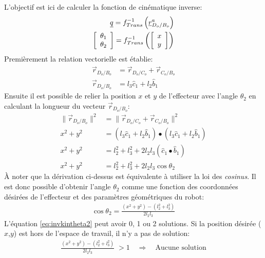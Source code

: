 L'objectif est ici de calculer la fonction de cinématique inverse:
\begin{align}
	\underline{q} = f^{-1}_{Trans}\left( \underline{r}^a_{D_o/B_o} \right) \\
	\left[ \begin{array}{c}
			   \theta_1 \\ \theta_2
	\end{array} \right]
	= f^{-1}_{Trans}\left( \left[ \begin{array}{c }
									  x \\ y
	\end{array} \right]  \right)
\end{align}
Premièrement la relation vectorielle est établie:
\begin{align}
	\vec{r}_{D_o/B_o} &=  \vec{r}_{D_o/C_o} + \vec{r}_{C_o/B_o} \\
	\vec{r}_{D_o/B_o} &=  l_3 \hat{c}_1     + l_2 \hat{b}_1
\end{align}
Ensuite il est possible de relier la position $x$ et $y$ de l'effecteur avec l'angle $\theta_2$ en calculant la longueur du vecteur $\vec{r}_{D_o/B_o}$:
\begin{align}
	\| \vec{r}_{D_o/B_o} \|^2  &=  \| \vec{r}_{D_o/C_o} + \vec{r}_{C_o/B_o} \|^2 \\
	x^2 + y^2 &=  (l_3 \hat{c}_1 + l_2 \hat{b}_1) \bullet (l_3 \hat{c}_1+ l_2 \hat{b}_1) \\
	x^2 + y^2 &=  l_2^2 + l_3^2 + 2 l_2 l_3 ( \hat{c}_1 \bullet \hat{b}_1 ) \\
	x^2 + y^2 &=  l_2^2 + l_3^2 + 2 l_2 l_3 \cos \theta_2
\end{align}
À noter que la dérivation ci-dessus est équivalente à utiliser la loi des \textit{cosinus}. Il est donc possible d'obtenir l'angle $\theta_2$ comme une fonction des coordonnées désirées de l'effecteur et des paramètres géométriques du robot:
\begin{align}
	\cos \theta_2 = \frac{ (x^2 + y^2) - (l_2^2 + l_3^2) }{2 l_2 l_3}
	\label{eq:invkintheta2}
\end{align}
L'équation \eqref{eq:invkintheta2} peut avoir 0, 1 ou 2 solutions. Si la position désirée ($x$,$y$) est hors de l'espace de travail, il n'y a pas de solution:
\begin{align}
	\frac{ (x^2 + y^2) - (l_2^2 + l_3^2)}{2 l_2 l_3} \; > 1 \quad\Rightarrow\quad \text{Aucune solution}
\end{align}
